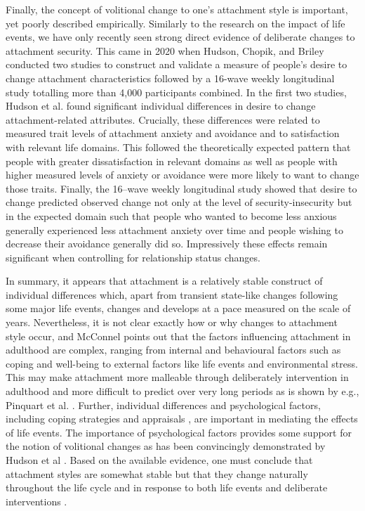 \documentclass[12pt]{report}
\begin{document}
Finally, the concept of volitional change to one's attachment style is important, yet poorly described empirically. Similarly to the research on the impact of life events, we have only recently seen strong direct evidence of deliberate changes to attachment security. This came in 2020 when Hudson, Chopik, and Briley \cite{Hudson2020} conducted two studies to construct and validate a measure of people's desire to change attachment characteristics followed by a 16-wave weekly longitudinal study totalling more than 4,000 participants combined.
In the first two studies, Hudson et al. found significant individual differences in desire to change attachment-related attributes. Crucially, these differences were related to measured trait levels of attachment anxiety and avoidance and to satisfaction with relevant life domains. This followed the theoretically expected pattern that people with greater dissatisfaction in relevant domains as well as people with higher measured levels of anxiety or avoidance were more likely to want to change those traits.
Finally, the 16–wave weekly longitudinal study showed that desire to change predicted observed change not only at the level of security-insecurity but in the expected domain such that people who wanted to become less anxious generally experienced less attachment anxiety over time and people wishing to decrease their avoidance generally did so. Impressively these effects remain significant when controlling for relationship status changes.


In summary, it appears that attachment is a relatively stable construct of individual differences which, apart from transient state-like changes following some major life events, changes and develops at a pace measured on the scale of years. Nevertheless, it is not clear exactly how or why changes to attachment style occur, and McConnel \cite{McConnell2011} points out that the factors influencing attachment in adulthood are complex, ranging from internal and behavioural factors such as coping and well-being to external factors like life events and environmental stress. This may make attachment more malleable through deliberately intervention in adulthood and more difficult to predict over very long periods as is shown by e.g., Pinquart et al. \cite{Pinquart2013}.
Further, individual differences and psychological factors, including coping strategies \cite{Zhang2004} and appraisals \cite{Fraley2021}, are important in mediating the effects of life events. The importance of psychological factors provides some support for the notion of volitional changes as has been convincingly demonstrated by Hudson et al \cite{Hudson2020}.
Based on the available evidence, one must conclude that attachment styles are somewhat stable but that they change naturally throughout the life cycle \cite{Rowe2005,Doherty2004,Fraley1997} and in response to both life events \cite{Fraley2021} and deliberate interventions \cite{Hudson2020}.
\end{document}
